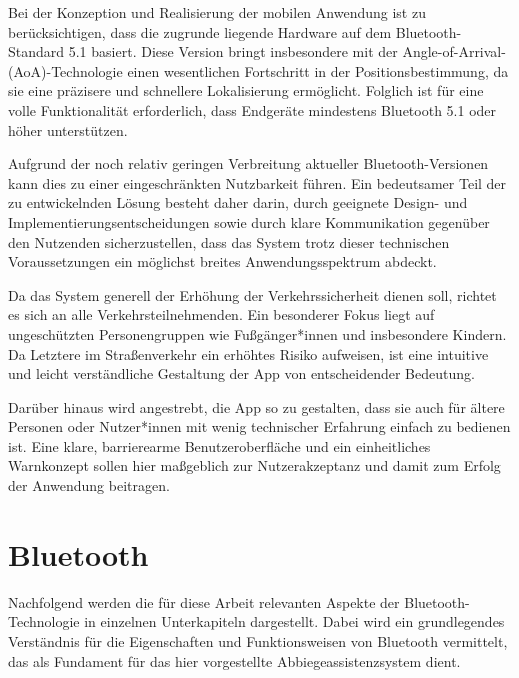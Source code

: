\documentclass[a4paper, 12pt]{article} %
\begin{document}
\begin{spacing}{1.8}  %
\fontsize{14pt}{15pt}\selectfont  %


Bei der Konzeption und Realisierung der mobilen Anwendung ist
 zu berücksichtigen, dass die zugrunde liegende Hardware auf dem 
 Bluetooth-Standard 5.1 basiert. Diese Version bringt insbesondere mit der 
 Angle-of-Arrival-(AoA)-Technologie einen wesentlichen Fortschritt in der Positionsbestimmung, da sie eine präzisere und schnellere Lokalisierung ermöglicht. Folglich ist für eine volle Funktionalität erforderlich, dass Endgeräte mindestens Bluetooth 5.1 oder höher unterstützen. 

Aufgrund der noch relativ geringen Verbreitung aktueller
 Bluetooth-Versionen kann dies zu einer eingeschränkten Nutzbarkeit führen. 
 Ein bedeutsamer Teil der zu entwickelnden Lösung besteht daher darin, durch 
 geeignete Design- und Implementierungsentscheidungen sowie durch klare Kommunikation gegenüber den Nutzenden sicherzustellen, dass das System trotz dieser technischen Voraussetzungen ein möglichst breites Anwendungsspektrum abdeckt.  


Da das System generell der Erhöhung der Verkehrssicherheit
 dienen soll, richtet es sich an alle Verkehrsteilnehmenden. Ein besonderer 
 Fokus liegt auf ungeschützten Personengruppen wie Fußgänger*innen und insbesondere Kindern. Da Letztere im Straßenverkehr ein erhöhtes Risiko aufweisen, ist eine intuitive und leicht verständliche Gestaltung der App von entscheidender Bedeutung.  

Darüber hinaus wird angestrebt, die App so zu
 gestalten, dass sie auch für ältere Personen oder Nutzer*innen mit wenig
  technischer Erfahrung einfach zu bedienen ist. Eine klare, barrierearme
   Benutzeroberfläche und ein einheitliches Warnkonzept sollen hier maßgeblich
    zur Nutzerakzeptanz und damit zum Erfolg der Anwendung beitragen.
\end{spacing}

\clearpage

\section{Bluetooth}

\begin{spacing}{1.8}  %
\fontsize{14pt}{15pt}\selectfont  %

Nachfolgend werden die für diese Arbeit relevanten Aspekte der Bluetooth-Technologie in einzelnen Unterkapiteln dargestellt.
 Dabei wird ein grundlegendes Verständnis für die Eigenschaften und Funktionsweisen von Bluetooth vermittelt, das als Fundament für das hier vorgestellte
 Abbiegeassistenzsystem dient.

\end{spacing}
\end{document}
